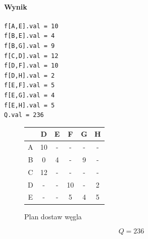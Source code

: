 \paragraph{Wynik}
\begin{lstlisting}[caption=Wynik z glpk]
f[A,E].val = 10
f[B,E].val = 4
f[B,G].val = 9
f[C,D].val = 12
f[D,F].val = 10
f[D,H].val = 2
f[E,F].val = 5
f[E,G].val = 4
f[E,H].val = 5
Q.val = 236
\end{lstlisting}

\begin{figure}[htb]
\caption{Plan dostaw węgla}
\begin{center}
\begin{tabular}{ | c | c | c | c | c | c | }
\hline
  & D & E & F & G & H \\ 
 \hline
 A & 10 & - & - & - & -\\  
 \hline
 B & 0 & 4 & - & 9 & - \\
 \hline  
 C & 12 & - & - & - & - \\
 \hline  
 D & - & - & 10 & - & 2 \\
 \hline  
 E & - & - & 5 & 4 & 5 \\
 \hline  
\end{tabular}
\end{center}
\end{figure}

\[ Q = 236 \]

